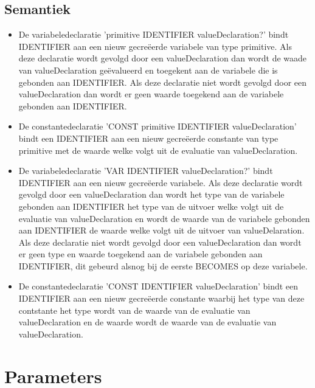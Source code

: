     \subsection{Semantiek}
        \begin{itemize}
        \item De variabeledeclaratie 'primitive IDENTIFIER valueDeclaration?' bindt IDENTIFIER aan een nieuw gecre\"{e}erde variabele van type primitive. Als deze declaratie wordt gevolgd door een valueDeclaration dan wordt de waade van valueDeclaration ge\"{e}valueerd en toegekent aan de variabele die is gebonden aan IDENTIFIER. Als deze declaratie niet wordt gevolgd door een valueDeclaration dan wordt er geen waarde toegekend aan de variabele gebonden aan IDENTIFIER.
        \item De constantedeclaratie 'CONST primitive IDENTIFIER valueDeclaration' bindt een IDENTIFIER aan een nieuw gecre\"{e}erde constante van type primitive met de waarde welke volgt uit de evaluatie van valueDeclaration.
        \item De variabeledeclaratie 'VAR IDENTIFIER valueDeclaration?' bindt IDENTIFIER aan een nieuw gecre\"{e}erde variabele. Als deze declaratie wordt gevolgd door een valueDeclaration dan wordt het type van de variabele gebonden aan IDENTIFIER het type van de uitvoer welke volgt uit de evaluatie van valueDeclaration en wordt de waarde van de variabele gebonden aan IDENTIFIER de waarde welke volgt uit de uitvoer van valueDelaration. Als deze declaratie niet wordt gevolgd door een valueDeclaration dan wordt er geen type en waarde toegekend aan de variabele gebonden aan IDENTIFIER, dit gebeurd alsnog bij de eerste BECOMES op deze variabele.
        \item De constantedeclaratie 'CONST IDENTIFIER valueDeclaration' bindt een IDENTIFIER aan een nieuw gecre\"{e}erde constante waarbij het type van deze contstante het type wordt van de waarde van de evaluatie van valueDeclaration en de waarde wordt de waarde van de evaluatie van valueDeclaration. 
        \end{itemize}
\section{Parameters}

